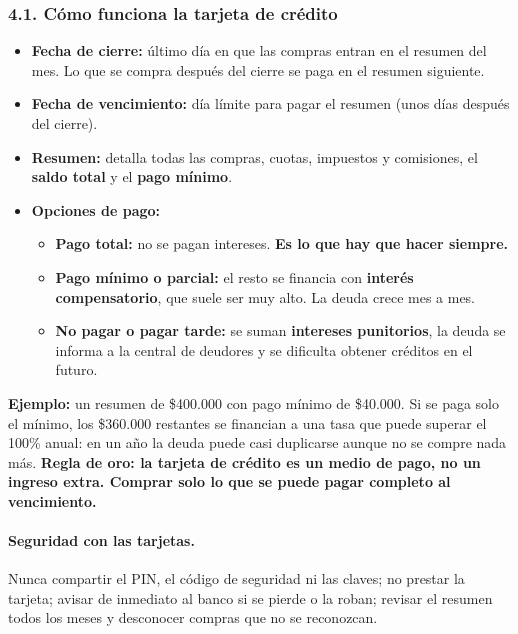 \subsubsection*{4.1. Cómo funciona la tarjeta de crédito}
\begin{itemize}
  \item \textbf{Fecha de cierre:} último día en que las compras entran en el resumen del mes.
        Lo que se compra después del cierre se paga en el resumen siguiente.
  \item \textbf{Fecha de vencimiento:} día límite para pagar el resumen (unos días después del
        cierre).
  \item \textbf{Resumen:} detalla todas las compras, cuotas, impuestos y comisiones, el
        \textbf{saldo total} y el \textbf{pago mínimo}.
  \item \textbf{Opciones de pago:}
  \begin{itemize}
    \item \textbf{Pago total:} no se pagan intereses. \textbf{Es lo que hay que hacer siempre.}
    \item \textbf{Pago mínimo o parcial:} el resto se financia con \textbf{interés
          compensatorio}, que suele ser muy alto. La deuda crece mes a mes.
    \item \textbf{No pagar o pagar tarde:} se suman \textbf{intereses punitorios}, la deuda se
          informa a la central de deudores y se dificulta obtener créditos en el futuro.
  \end{itemize}
\end{itemize}

\begin{recuadro}
\textbf{Ejemplo:} un resumen de \$400.000 con pago mínimo de \$40.000. Si se paga solo el
mínimo, los \$360.000 restantes se financian a una tasa que puede superar el 100\% anual: en
un año la deuda puede casi duplicarse aunque no se compre nada más. \textbf{Regla de oro: la
tarjeta de crédito es un medio de pago, no un ingreso extra. Comprar solo lo que se puede pagar
completo al vencimiento.}
\end{recuadro}

\paragraph*{Seguridad con las tarjetas.}
Nunca compartir el PIN, el código de seguridad ni las claves; no prestar la tarjeta; avisar de
inmediato al banco si se pierde o la roban; revisar el resumen todos los meses y desconocer
compras que no se reconozcan.

